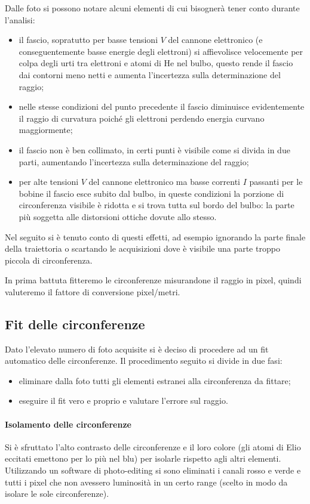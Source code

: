 Dalle foto si possono notare alcuni elementi di cui bisognerà tener conto durante l'analisi:
\begin{itemize}
	\item il fascio, sopratutto per basse tensioni $V$ del cannone elettronico (e conseguentemente basse energie degli elettroni) si affievolisce velocemente per colpa degli urti tra elettroni e atomi di He nel bulbo, questo rende il fascio dai contorni meno netti e aumenta l'incertezza sulla determinazione del raggio;
	\item nelle stesse condizioni del punto precedente il fascio diminuisce evidentemente il raggio di curvatura poiché gli elettroni perdendo energia curvano maggiormente;
	\item il fascio non è ben collimato, in certi punti è visibile come si divida in due parti, aumentando l'incertezza sulla determinazione del raggio;
	\item per alte tensioni $V$ del cannone elettronico ma basse correnti $I$ passanti per le bobine il fascio esce subito dal bulbo, in queste condizioni la porzione di circonferenza visibile è ridotta e si trova tutta sul bordo del bulbo: la parte più soggetta alle distorsioni ottiche dovute allo stesso.
\end{itemize}

Nel seguito si è tenuto conto di questi effetti, ad esempio ignorando la parte finale della traiettoria o scartando le acquisizioni dove è visibile una parte troppo piccola di circonferenza.

In prima battuta fitteremo le circonferenze misurandone il raggio in pixel, quindi valuteremo il fattore di conversione pixel/metri.

\subsection{Fit delle circonferenze}
Dato l'elevato numero di foto acquisite si è deciso di procedere ad un fit automatico delle circonferenze. Il procedimento seguito si divide in due fasi:
\begin{itemize}
	\item eliminare dalla foto tutti gli elementi estranei alla circonferenza da fittare;
	\item eseguire il fit vero e proprio e valutare l'errore sul raggio.
\end{itemize}

\paragraph{Isolamento delle circonferenze} Si è sfruttato l'alto contrasto delle circonferenze e il loro colore (gli atomi di Elio eccitati emettono per lo più nel blu) per isolarle rispetto agli altri elementi. Utilizzando un software di photo-editing si sono eliminati i canali rosso e verde e tutti i pixel che non avessero luminosità in un certo range (scelto in modo da isolare le sole circonferenze).

